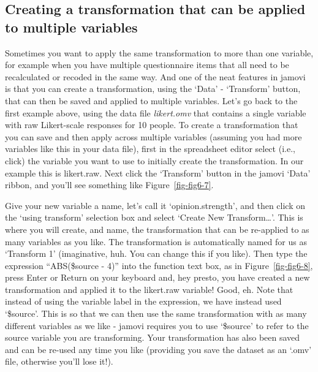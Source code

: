 \documentclass[
  a4paper,
]{book}
\begin{document}
\hypertarget{creating-a-transformation-that-can-be-applied-to-multiple-variables}{%
\subsection{Creating a transformation that can be applied to multiple
variables}\label{creating-a-transformation-that-can-be-applied-to-multiple-variables}}

Sometimes you want to apply the same transformation to more than one
variable, for example when you have multiple questionnaire items that
all need to be recalculated or recoded in the same way. And one of the
neat features in jamovi is that you can create a transformation, using
the `Data' - `Transform' button, that can then be saved and applied to
multiple variables. Let's go back to the first example above, using the
data file \emph{likert.omv} that contains a single variable with raw
Likert-scale responses for 10 people. To create a transformation that
you can save and then apply across multiple variables (assuming you had
more variables like this in your data file), first in the spreadsheet
editor select (i.e., click) the variable you want to use to initially
create the transformation. In our example this is likert.raw. Next click
the `Transform' button in the jamovi `Data' ribbon, and you'll see
something like Figure~\ref{fig-fig6-7}.

Give your new variable a name, let's call it `opinion.strength', and
then click on the `using transform' selection box and select `Create New
Transform\ldots{}'. This is where you will create, and name, the
transformation that can be re-applied to as many variables as you like.
The transformation is automatically named for us as `Transform 1'
(imaginative, huh. You can change this if you like). Then type the
expression ``ABS(\$source - 4)'' into the function text box, as in
Figure~\ref{fig-fig6-8}, press Enter or Return on your keyboard and, hey
presto, you have created a new transformation and applied it to the
likert.raw variable! Good, eh. Note that instead of using the variable
label in the expression, we have instead used `\$source'. This is so
that we can then use the same transformation with as many different
variables as we like - jamovi requires you to use `\$source' to refer to
the source variable you are transforming. Your transformation has also
been saved and can be re-used any time you like (providing you save the
dataset as an `.omv' file, otherwise you'll lose it!).
\end{document}
